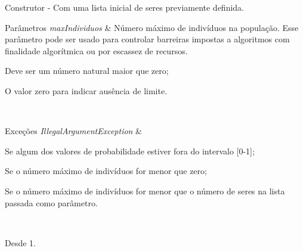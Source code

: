 Construtor -\/ Com uma lista inicial de {\ttfamily seres} previamente definida. 


\begin{DoxyParams}{Parâmetros}
{\em max\-Individuos} & Número máximo de indivíduos na {\ttfamily população}. Esse parâmetro pode ser usado para controlar barreiras impostas a algoritmos com finalidade algorítmica ou por escassez de recursos. 
\begin{DoxyItemize}
\item Deve ser um número natural maior que zero; 
\item O valor zero para indicar ausência de limite.  
\end{DoxyItemize}\\
\hline
\end{DoxyParams}

\begin{DoxyExceptions}{Exceções}
{\em Illegal\-Argument\-Exception} & 
\begin{DoxyItemize}
\item Se algum dos valores de probabilidade estiver fora do intervalo \mbox{[}0-\/1\mbox{]}; 
\item Se o número máximo de indivíduos for menor que zero; 
\item Se o número máximo de indivíduos for menor que o número de {\ttfamily seres} na lista passada como parâmetro. 
\end{DoxyItemize}\\
\hline
\end{DoxyExceptions}
\begin{DoxySince}{Desde}
1. 
\end{DoxySince}


